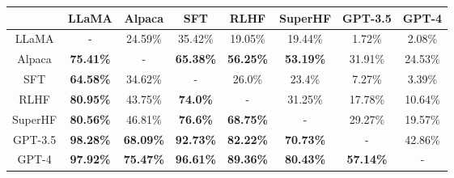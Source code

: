 \begin{tabular}{|c|c|c|c|c|c|c|c|}
\hline
 & LLaMA & Alpaca & SFT & RLHF & SuperHF & GPT-3.5 & GPT-4 \\
\hline
LLaMA & - & 24.59\% & 35.42\% & 19.05\% & 19.44\% & 1.72\% & 2.08\% \\
\hline
Alpaca & \textbf{75.41\%} & - & \textbf{65.38\%} & \textbf{56.25\%} & \textbf{53.19\%} & 31.91\% & 24.53\% \\
\hline
SFT & \textbf{64.58\%} & 34.62\% & - & 26.0\% & 23.4\% & 7.27\% & 3.39\% \\
\hline
RLHF & \textbf{80.95\%} & 43.75\% & \textbf{74.0\%} & - & 31.25\% & 17.78\% & 10.64\% \\
\hline
SuperHF & \textbf{80.56\%} & 46.81\% & \textbf{76.6\%} & \textbf{68.75\%} & - & 29.27\% & 19.57\% \\
\hline
GPT-3.5 & \textbf{98.28\%} & \textbf{68.09\%} & \textbf{92.73\%} & \textbf{82.22\%} & \textbf{70.73\%} & - & 42.86\% \\
\hline
GPT-4 & \textbf{97.92\%} & \textbf{75.47\%} & \textbf{96.61\%} & \textbf{89.36\%} & \textbf{80.43\%} & \textbf{57.14\%} & - \\
\hline
\end{tabular}
